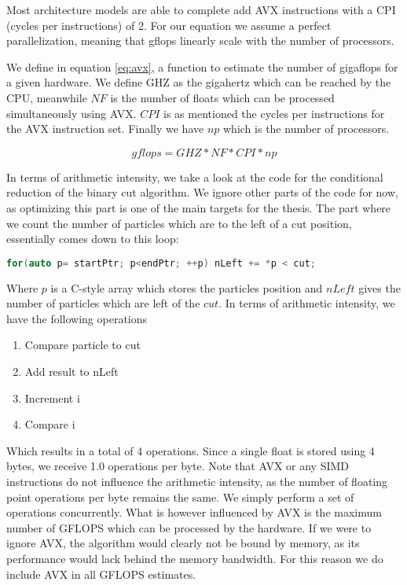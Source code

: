 \documentclass[]{article}
\begin{document}
Most architecture models are able to complete add AVX instructions with a CPI (cycles per instructions) of 2. For our equation we assume a perfect parallelization, meaning that gflops linearly scale with the number of processors. 

We define in equation \ref{eq:avx}, a function to estimate the number of gigaflops for a given hardware. We define GHZ as the gigahertz which can be reached by the CPU, meanwhile $NF$ is the number of floats which can be processed simultaneously using AVX. $CPI$ is as mentioned the cycles per instructions for the AVX instruction set. Finally we have $np$ which is the number of processors.

\begin{center}
	\begin{equation}
		gflops = GHZ * NF * CPI * np
	\end{equation}
\label{eq:avx}
\end{center}

In terms of arithmetic intensity, we take a look at the code for the conditional reduction of the binary cut algorithm. We ignore other parts of the code for now, as optimizing this part is one of the main targets for the thesis. The part where we count the number of particles which are to the left of a cut position, essentially comes down to this loop:

\begin{lstlisting}[language=c++]
	for(auto p= startPtr; p<endPtr; ++p) nLeft += *p < cut;
\end{lstlisting}

Where $p$ is a C-style array which stores the particles position and $nLeft$ gives the number of particles which are left of the $cut$. In terms of arithmetic intensity, we have the following operations

\begin{enumerate}
	\item Compare particle to cut
	\item Add result to nLeft
	\item Increment i
	\item Compare i
\end{enumerate}

Which results in a total of 4 operations. Since a single float is stored using 4 bytes, we receive 1.0 operations per byte. Note that AVX or any SIMD instructions do not influence the arithmetic intensity, as the number of floating point operations per byte remains the same. We simply perform a set of operations concurrently. What is however influenced by AVX is the maximum number of GFLOPS which can be processed by the hardware. If we were to ignore AVX, the algorithm would clearly not be bound by memory, as its performance would lack behind the memory bandwidth. For this reason we do include AVX in all GFLOPS estimates.
\end{document}
